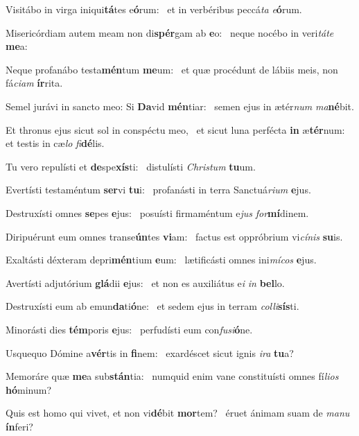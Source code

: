\item Visitábo in virga iniqui\textbf{tá}tes e\textbf{ó}rum:~\psstar{} et in verbéribus peccá\textit{ta} \textit{e}\textbf{ó}rum.
\item Misericórdiam autem meam non di\textbf{spér}gam ab \textbf{e}o:~\psstar{} neque nocébo in veri\textit{táte} \textbf{me}a:
\item Neque profanábo testa\textbf{mén}tum \textbf{me}um:~\psstar{} et quæ procédunt de lábiis meis, non fá\textit{ciam} \textbf{ír}rita.
\item Semel jurávi in sancto meo: Si \textbf{Da}vid \textbf{mén}tiar:~\psstar{} semen ejus in ætér\textit{num} \textit{ma}\textbf{né}bit.
\item Et thronus ejus sicut sol in conspéctu meo,~\pscross{} et sicut luna perfécta \textbf{in} æ\textbf{tér}num:~\psstar{} et testis in cæ\textit{lo} \textit{fi}\textbf{dé}lis.
\item Tu vero repulísti et \textbf{de}spe\textbf{xís}ti:~\psstar{} distulísti \textit{Christum} \textbf{tu}um.
\item Evertísti testaméntum \textbf{ser}vi \textbf{tu}i:~\psstar{} profanásti in terra Sanctuá\textit{rium} \textbf{e}jus.
\item Destruxísti omnes \textbf{se}pes \textbf{e}jus:~\psstar{} posuísti firmaméntum e\textit{jus} \textit{for}\textbf{mí}dinem.
\item Diripuérunt eum omnes transe\textbf{ún}tes \textbf{vi}am:~\psstar{} factus est oppróbrium vi\textit{cínis} \textbf{su}is.
\item Exaltásti déxteram depri\textbf{mén}tium \textbf{e}um:~\psstar{} lætificásti omnes ini\textit{mícos} \textbf{e}jus.
\item Avertísti adjutórium \textbf{glá}dii \textbf{e}jus:~\psstar{} et non es auxiliátus e\textit{i} \textit{in} \textbf{bel}lo.
\item Destruxísti eum ab emun\textbf{da}ti\-\textbf{ó}ne:~\psstar{} et sedem ejus in terram \textit{colli}\textbf{sís}ti.
\item Minorásti dies \textbf{tém}poris \textbf{e}jus:~\psstar{} perfudísti eum con\textit{fusi}\textbf{ó}ne.
\item Usquequo Dómine a\textbf{vér}tis in \textbf{fi}nem:~\psstar{} exardéscet sicut ignis \textit{ira} \textbf{tu}a?
\item Memoráre quæ \textbf{me}a sub\textbf{stán}\-tia:~\psstar{} numquid enim vane constituísti omnes fí\textit{lios} \textbf{hó}minum?
\item Quis est homo qui vivet, et non vi\textbf{dé}bit \textbf{mor}tem?~\psstar{} éruet ánimam suam de \textit{manu} \textbf{ín}feri?
